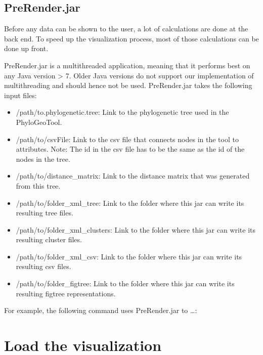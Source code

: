 \documentclass[a4paper, 11pt]{article} %
\begin{document}
\subsection{PreRender.jar}
Before any data can be shown to the user, a lot of calculations are done at the back end. 
To speed up the visualization process, most of those calculations can be done up front.

PreRender.jar is a multithreaded application, meaning that it performs best on any Java version > 7. 
Older Java versions do not support our implementation of multithreading and should hence not be used.
PreRender.jar takes the following input files: %
\begin{itemize}
\item /path/to.phylogenetic.tree: Link to the phylogenetic tree used in the PhyloGeoTool.
\item /path/to/csvFile: Link to the csv file that connects nodes in the tool to attributes. Note: The id in the csv file has to be the same as the id of the nodes in the tree.
\item /path/to/distance\_matrix: Link to the distance matrix that was generated from this tree.
\item /path/to/folder\_xml\_tree: Link to the folder where this jar can write its resulting tree files.
\item /path/to/folder\_xml\_clusters: Link to the folder where this jar can write its resulting cluster files.
\item /path/to/folder\_xml\_csv: Link to the folder where this jar can write its resulting csv files.
\item /path/to/folder\_figtree: Link to the folder where this jar can write its resulting figtree representations.
\end{itemize}

For example, the following command uses PreRender.jar to \ldots: %


\section{Load the visualization}
\end{document}
